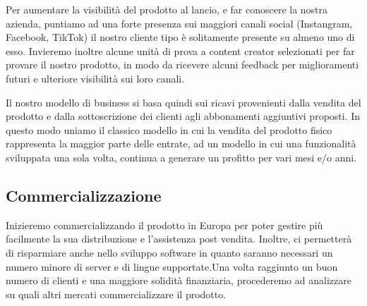 Per aumentare la visibilità del prodotto al lancio, e far conoscere la nostra azienda, puntiamo ad una forte presenza sui maggiori canali social (Instangram, Facebook, TikTok) il nostro cliente tipo è solitamente presente su almeno uno di esso. Invieremo inoltre alcune unità di prova a content creator selezionati per far provare il nostro prodotto, in modo da ricevere alcuni feedback per miglioramenti futuri e ulteriore visibilità sui loro canali.

Il nostro modello di business si basa quindi sui ricavi provenienti dalla vendita del prodotto e dalla sottoscrizione dei clienti agli abbonamenti aggiuntivi proposti. In questo modo uniamo il classico modello in cui la vendita del prodotto fisico rappresenta la maggior parte delle entrate, ad un modello in cui una funzionalità sviluppata una sola volta, continua a generare un profitto per vari mesi e/o anni.

\subsection{Commercializzazione}

Inizieremo commercializzando il prodotto in Europa per poter gestire più facilmente la sua distribuzione e l'assistenza post vendita. Inoltre, ci permetterà di risparmiare anche nello sviluppo software in quanto saranno necessari un numero minore di server e di lingue supportate.\newline Una volta raggiunto un buon numero di clienti e una maggiore solidità finanziaria, procederemo ad analizzare su quali altri mercati commercializzare il prodotto.